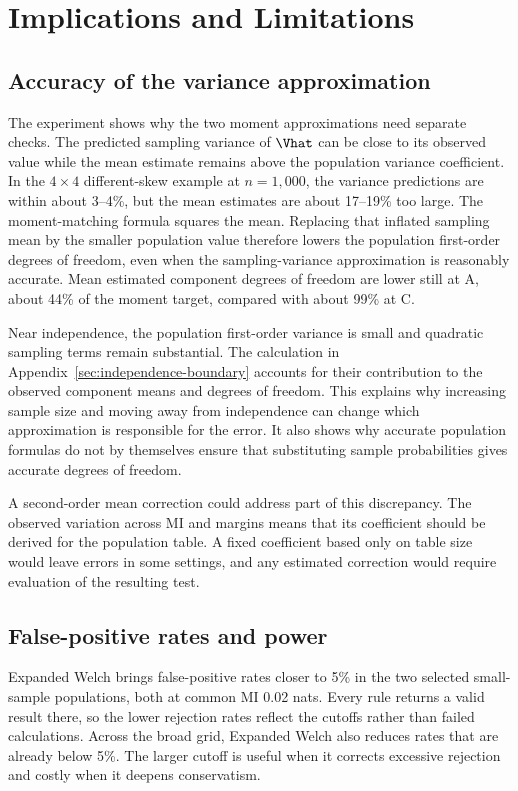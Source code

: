 \chapter{Implications and Limitations}
\label{chap:discussion}

\section{Accuracy of the variance approximation}

The experiment shows why the two moment approximations need separate
checks. The predicted sampling variance of \(\Vhat\) can be close to
its observed value while the mean estimate remains above the population
variance coefficient. In the \(4\times4\) different-skew example at
\(n=1{,}000\), the variance predictions are within about 3--4\%, but
the mean estimates are about 17--19\% too large. The moment-matching
formula squares the mean. Replacing that inflated sampling mean by the
smaller population value therefore lowers the population first-order
degrees of freedom, even when the sampling-variance approximation is
reasonably accurate. Mean estimated component degrees of freedom are
lower still at A, about 44\% of the moment target, compared with about
99\% at C.

Near independence, the population first-order variance is small and
quadratic sampling terms remain substantial. The calculation in
Appendix~\ref{sec:independence-boundary} accounts for their contribution
to the observed component means and degrees of freedom. This explains
why increasing sample size and moving away from independence can change
which approximation is responsible for the error. It also shows why
accurate population formulas do not by themselves ensure that substituting
sample probabilities gives accurate degrees of freedom.

A second-order mean correction could address part of this discrepancy.
The observed variation across MI and margins means that its coefficient
should be derived for the population table. A fixed coefficient based
only on table size would leave errors in some settings, and any estimated
correction would require evaluation of the resulting test.

\section{False-positive rates and power}

Expanded Welch brings false-positive rates closer to 5\% in the two
selected small-sample populations, both at common MI 0.02 nats.
Every rule returns a valid result
there, so the lower rejection rates reflect the cutoffs rather than
failed calculations. Across the broad grid, Expanded Welch also reduces
rates that are already below 5\%. The larger cutoff is useful when
it corrects excessive rejection and costly when it deepens conservatism.

